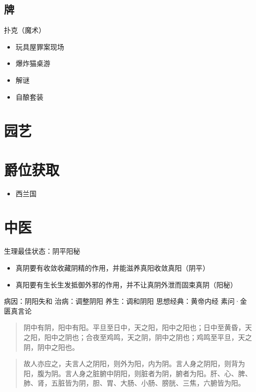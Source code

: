 \documentclass[
  letterpaper,
  DIV=11,
  numbers=noendperiod]{scrreprt}
\providecommand{\tightlist}{%
  \setlength{\itemsep}{0pt}\setlength{\parskip}{0pt}}\usepackage{longtable,booktabs,array}
\begin{document}
\subsection{牌}\label{ux724c}

扑克（魔术）

\begin{itemize}
\item
  玩具屋罪案现场
\item
  爆炸猫桌游
\item
  解谜
\item
  自酿套装
\end{itemize}

\section{园艺}\label{ux56edux827a}

\section{爵位获取}\label{ux7235ux4f4dux83b7ux53d6}

\begin{itemize}
\tightlist
\item
  西兰国
\end{itemize}

\section{中医}\label{ux4e2dux533b}

生理最佳状态：阴平阳秘

\begin{itemize}
\item
  真阴要有收敛收藏阴精的作用，并能滋养真阳收敛真阳（阴平）
\item
  真阳要有生长生发抵御外邪的作用，并不让真阴外泄而固束真阴（阳秘）
\end{itemize}

病因：阴阳失和 治病：调整阴阳 养生：调和阴阳 思想经典：黄帝内经
素问·金匮真言论

\begin{quote}
阴中有阴，阳中有阳。平旦至日中，天之阳，阳中之阳也；日中至黄昏，天之阳，阳中之阴也；合夜至鸡鸣，天之阴，阴中之阴也；鸡鸣至平旦，天之阴，阴中之阳也。
\end{quote}

\begin{quote}
故人亦应之，夫言人之阴阳，则外为阳，内为阴。言人身之阴阳，则背为阳，腹为阴。言人身之脏腑中阴阳，则脏者为阴，腑者为阳。肝、心、脾、肺、肾，五脏皆为阴，胆、胃、大肠、小肠、膀胱、三焦，六腑皆为阳。
\end{quote}
\end{document}
